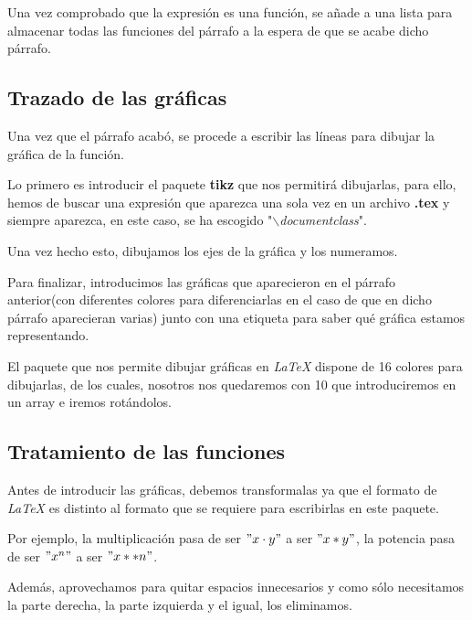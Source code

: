 \documentclass[a4paper, 11pt]{article} %
\begin{document}
		Una vez comprobado que la expresión es una función, se añade a una lista para almacenar todas las funciones del párrafo a la espera de que se acabe dicho párrafo.
		
	\subsection{Trazado de las gráficas}
		Una vez que el párrafo acabó, se procede a escribir las líneas para dibujar la gráfica de la función.
		
		Lo primero es introducir el paquete \textbf{tikz} que nos permitirá dibujarlas, para ello, hemos de buscar una expresión que aparezca una sola vez en un archivo \textbf{.tex} y siempre aparezca, en este caso, se ha escogido "\textit{$\backslash$documentclass}".
		
		Una vez hecho esto, dibujamos los ejes de la gráfica y los numeramos.
		
		Para finalizar, introducimos las gráficas que aparecieron en el párrafo anterior(con diferentes colores para diferenciarlas en el caso de que en dicho párrafo aparecieran varias) junto con una etiqueta para saber qué gráfica estamos representando.
		
		El paquete que nos permite dibujar gráficas en \textit{LaTeX} dispone de 16 colores para dibujarlas, de los cuales, nosotros nos quedaremos con 10 que introduciremos en un array e iremos rotándolos.
		
	\subsection{Tratamiento de las funciones}
		Antes de introducir las gráficas, debemos transformalas ya que el formato de \textit{LaTeX} es distinto al formato que se requiere para escribirlas en este paquete.
		
		Por ejemplo, la multiplicación pasa de ser $"x \cdot y"$ a ser $"x*y"$, la potencia pasa de ser $"x^n"$ a ser $"x**n"$.
		
		Además, aprovechamos para quitar espacios innecesarios y como sólo necesitamos la parte derecha, la parte izquierda y el igual, los eliminamos.
\end{document}
